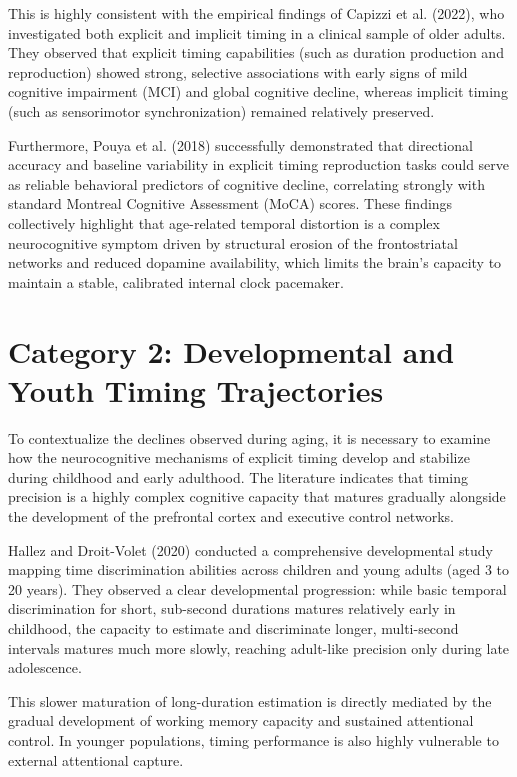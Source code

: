 \documentclass{custom_report}
\begin{document}
This is highly consistent with the empirical findings of Capizzi et al. (2022), who investigated both explicit and implicit timing in a clinical sample of older adults. They observed that explicit timing capabilities (such as duration production and reproduction) showed strong, selective associations with early signs of mild cognitive impairment (MCI) and global cognitive decline, whereas implicit timing (such as sensorimotor synchronization) remained relatively preserved. 

Furthermore, Pouya et al. (2018) successfully demonstrated that directional accuracy and baseline variability in explicit timing reproduction tasks could serve as reliable behavioral predictors of cognitive decline, correlating strongly with standard Montreal Cognitive Assessment (MoCA) scores. These findings collectively highlight that age-related temporal distortion is a complex neurocognitive symptom driven by structural erosion of the frontostriatal networks and reduced dopamine availability, which limits the brain's capacity to maintain a stable, calibrated internal clock pacemaker.

\section{Category 2: Developmental and Youth Timing Trajectories}
To contextualize the declines observed during aging, it is necessary to examine how the neurocognitive mechanisms of explicit timing develop and stabilize during childhood and early adulthood. The literature indicates that timing precision is a highly complex cognitive capacity that matures gradually alongside the development of the prefrontal cortex and executive control networks.

Hallez and Droit-Volet (2020) conducted a comprehensive developmental study mapping time discrimination abilities across children and young adults (aged 3 to 20 years). They observed a clear developmental progression: while basic temporal discrimination for short, sub-second durations matures relatively early in childhood, the capacity to estimate and discriminate longer, multi-second intervals matures much more slowly, reaching adult-like precision only during late adolescence. 

This slower maturation of long-duration estimation is directly mediated by the gradual development of working memory capacity and sustained attentional control. In younger populations, timing performance is also highly vulnerable to external attentional capture. 
\end{document}
